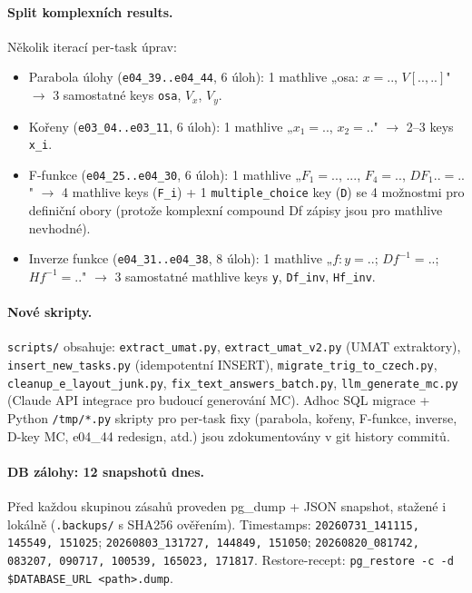 \documentclass[11pt,a4paper]{article}
\begin{document}
\paragraph{Split komplexních results.} Několik iterací per-task úprav:
\begin{itemize}
  \item Parabola úlohy (\texttt{e04\_39..e04\_44}, 6 úloh): 1 mathlive „osa: $x=..$, $V[..,..]$" $\rightarrow$ 3 samostatné keys \texttt{osa}, $V_x$, $V_y$.
  \item Kořeny (\texttt{e03\_04..e03\_11}, 6 úloh): 1 mathlive „$x_1=..$, $x_2=..$" $\rightarrow$ 2--3 keys \texttt{x\_i}.
  \item F-funkce (\texttt{e04\_25..e04\_30}, 6 úloh): 1 mathlive „$F_1=..$, ..., $F_4=..$, $DF_1..=..$" $\rightarrow$ 4 mathlive keys (\texttt{F\_i}) + 1 \texttt{multiple\_choice} key (\texttt{D}) se 4 možnostmi pro definiční obory (protože komplexní compound Df zápisy jsou pro mathlive nevhodné).
  \item Inverze funkce (\texttt{e04\_31..e04\_38}, 8 úloh): 1 mathlive „$f: y=..$; $Df^{-1}=..$; $Hf^{-1}=..$" $\rightarrow$ 3 samostatné mathlive keys \texttt{y}, \texttt{Df\_inv}, \texttt{Hf\_inv}.
\end{itemize}

\paragraph{Nové skripty.} \texttt{scripts/} obsahuje: \texttt{extract\_umat.py}, \texttt{extract\_umat\_v2.py} (UMAT extraktory), \texttt{insert\_new\_tasks.py} (idempotentní INSERT), \texttt{migrate\_trig\_to\_czech.py}, \texttt{cleanup\_e\_layout\_junk.py}, \texttt{fix\_text\_answers\_batch.py}, \texttt{llm\_generate\_mc.py} (Claude API integrace pro budoucí generování MC). Adhoc SQL migrace + Python \texttt{/tmp/*.py} skripty pro per-task fixy (parabola, kořeny, F-funkce, inverse, D-key MC, e04\_44 redesign, atd.) jsou zdokumentovány v git history commitů.

\paragraph{DB zálohy: 12 snapshotů dnes.} Před každou skupinou zásahů proveden pg\_dump + JSON snapshot, stažené i lokálně (\texttt{.backups/} s SHA256 ověřením). Timestamps: \texttt{20260731\_141115, 145549, 151025}; \texttt{20260803\_131727, 144849, 151050}; \texttt{20260820\_081742, 083207, 090717, 100539, 165023, 171817}. Restore-recept: \texttt{pg\_restore -c -d \$DATABASE\_URL <path>.dump}.
\end{document}

